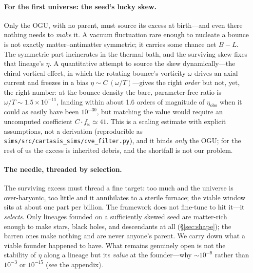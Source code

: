\paragraph{For the first universe: the seed's lucky skew.} Only the OGU, with no
parent, must source its excess at birth---and even there nothing needs to
\emph{make} it. A vacuum fluctuation rare enough to nucleate a bounce is not
exactly matter--antimatter symmetric; it carries some chance net $B-L$. The
symmetric part incinerates in the thermal bath, and the surviving skew fixes that
lineage's $\eta$. A quantitative attempt to source the skew dynamically---the
chiral-vortical effect, in which the rotating bounce's vorticity $\omega$ drives an
axial current and freezes in a bias $\eta\sim C\,(\omega/T)$---gives the right
\emph{order} but not, yet, the right number: at the bounce density the bare,
parameter-free ratio is $\omega/T\sim1.5\times10^{-11}$, landing within about 1.6
orders of magnitude of $\eta_{\mathrm{obs}}$ when it could as easily have been
$10^{-30}$, but matching the value would require an uncomputed coefficient
$C\!\cdot\!f_\omega\simeq41$. This is a scaling estimate with explicit
assumptions, not a derivation (reproducible as
\texttt{sims/src/cartasis\_sims/cve\_filter.py}), and it binds \emph{only} the
OGU; for the rest of us the excess is inherited debris, and the shortfall is not
our problem.

\paragraph{The needle, threaded by selection.} The surviving excess must thread a
fine target: too much and the universe is over-baryonic, too little and it
annihilates to a sterile furnace; the viable window sits at about one part per
billion. The framework does not fine-tune to hit it---it \emph{selects}. Only
lineages founded on a sufficiently skewed seed are matter-rich enough to make
stars, black holes, and descendants at all (\S\ref{sec:shape}); the barren ones
make nothing and are never anyone's parent. We carry down what a viable founder
happened to have. What remains genuinely open is not the stability of $\eta$ along
a lineage but its \emph{value} at the founder---why $\sim10^{-9}$ rather than
$10^{-3}$ or $10^{-15}$ (see the appendix).

